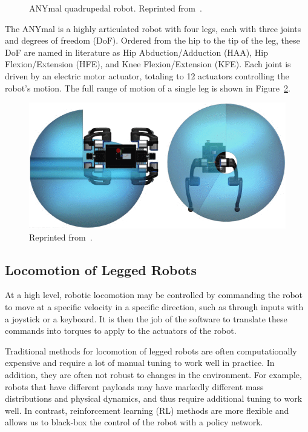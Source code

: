 \documentclass[12pt]{report}
\theoremstyle{definition}
\theoremstyle{remark}
\begin{document}
\begin{figure}[h]
\begin{subfigure}[b]{0.55\linewidth}
    \end{subfigure}
    \caption{ANYmal quadrupedal robot. Reprinted from~\cite{hutter_anymal_2016}.}
    \label{fig:anymal}
\end{figure}

The ANYmal is a highly articulated robot with four legs, each with three joints and degrees of freedom (DoF). Ordered from the hip to the tip of the leg, these DoF are named in literature as Hip Abduction/Adduction (HAA), Hip Flexion/Extension (HFE), and Knee Flexion/Extension (KFE). Each joint is driven by an electric motor actuator, totaling to 12 actuators controlling the robot's motion. The full range of motion of a single leg is shown in Figure~\ref{fig:anymal-joint-range}.
\begin{figure}[h]
    \centering
    \includegraphics[width=0.7\linewidth]{figs/anymal_range_of_motion.png}
    \caption{Reprinted from~\cite{hutter_anymal_2016}.}
    \label{fig:anymal-joint-range}
\end{figure}

\subsection{Locomotion of Legged Robots}

At a high level, robotic locomotion may be controlled by commanding the robot to move at a specific velocity in a specific direction, such as through inputs with a joystick or a keyboard. It is then the job of the software to translate these commands into torques to apply to the actuators of the robot.

Traditional methods for locomotion of legged robots are often computationally expensive and require a lot of manual tuning to work well in practice. In addition, they are often not robust to changes in the environment. For example, robots that have different payloads may have markedly different mass distributions and physical dynamics, and thus require additional tuning to work well. In contrast, reinforcement learning (RL) methods are more flexible and allows us to black-box the control of the robot with a policy network.
\end{document}
